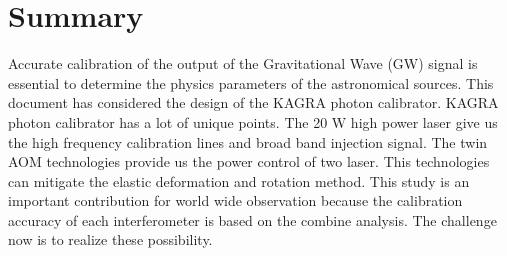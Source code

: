 
\chapter{Summary} %

\label{Chapter8} %
Accurate calibration of the output of the Gravitational Wave (GW) signal is 
essential to determine the physics parameters of the astronomical sources. 
This document has considered the design of the KAGRA photon calibrator.
KAGRA photon calibrator has a lot of unique points.
The 20 W high power laser give us the high frequency calibration lines and broad band injection signal.
The twin AOM technologies provide us the power control of two laser. This technologies can mitigate the elastic deformation and rotation method.
This study is an important contribution for world wide observation because the calibration accuracy of each interferometer is based on the combine analysis. 
The challenge now is to realize these possibility.

